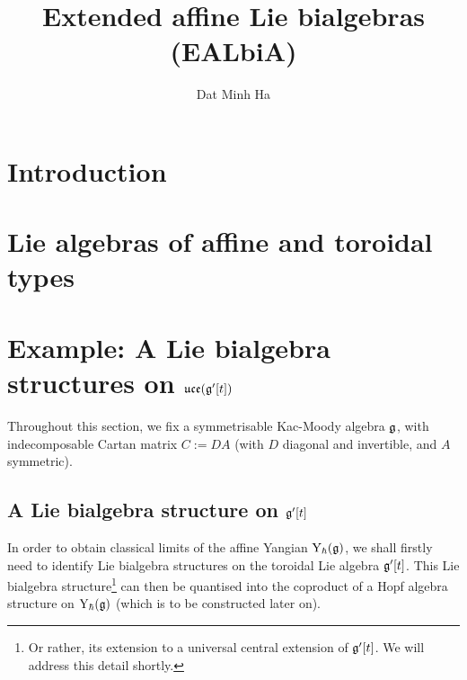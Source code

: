 

\setcounter{section}{-1}





    \title{Extended affine Lie bialgebras (EALbiA)}
    
    \author{Dat Minh Ha}
    \maketitle
    
    \begin{abstract}
    
    \end{abstract}
    
    {
    \hypersetup{} 
    \tableofcontents %
    }

    \section{Introduction}

    \section{Lie algebras of affine and toroidal types}

    \section{Example: A Lie bialgebra structures on \texorpdfstring{$\mathfrak{uce}( \mathfrak{g}'[t] )$}{}}
        \begin{convention}
            Throughout this section, we fix a symmetrisable Kac-Moody algebra $\mathfrak{g}$, with indecomposable Cartan matrix $C := DA$ (with $D$ diagonal and invertible, and $A$ symmetric). 
        \end{convention}
    
        \subsection{A Lie bialgebra structure on \texorpdfstring{$\mathfrak{g}'[t]$}{}}
            In order to obtain classical limits of the affine Yangian $\mathrm{Y}_{\hbar}(\mathfrak{g})$, we shall firstly need to identify Lie bialgebra structures on the toroidal Lie algebra $\mathfrak{g}'[t]$. This Lie bialgebra structure\footnote{Or rather, its extension to a universal central extension of $\mathfrak{g}'[t]$. We will address this detail shortly.} can then be quantised into the coproduct of a Hopf algebra structure on $\mathrm{Y}_{\hbar}(\mathfrak{g})$ (which is to be constructed later on). 

